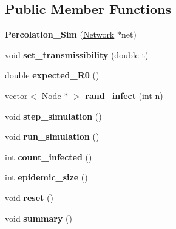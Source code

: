\subsection*{Public Member Functions}
\begin{DoxyCompactItemize}
\item 
\hypertarget{classPercolation__Sim_a68dc8b2121f6f555fd99711867634618}{}{\bfseries Percolation\+\_\+\+Sim} (\hyperlink{classNetwork}{Network} $\ast$net)\label{classPercolation__Sim_a68dc8b2121f6f555fd99711867634618}

\item 
\hypertarget{classPercolation__Sim_a331fbf29f66960463f2c6f2caab3bdf3}{}void {\bfseries set\+\_\+transmissibility} (double t)\label{classPercolation__Sim_a331fbf29f66960463f2c6f2caab3bdf3}

\item 
\hypertarget{classPercolation__Sim_ab0334facd8aebdb7df20e778a9577d09}{}double {\bfseries expected\+\_\+\+R0} ()\label{classPercolation__Sim_ab0334facd8aebdb7df20e778a9577d09}

\item 
\hypertarget{classPercolation__Sim_a71a7cd862e374aa87e7ff11f872aab0b}{}vector$<$ \hyperlink{classNode}{Node} $\ast$ $>$ {\bfseries rand\+\_\+infect} (int n)\label{classPercolation__Sim_a71a7cd862e374aa87e7ff11f872aab0b}

\item 
\hypertarget{classPercolation__Sim_abab9361ad723b13011469509dbcdddf4}{}void {\bfseries step\+\_\+simulation} ()\label{classPercolation__Sim_abab9361ad723b13011469509dbcdddf4}

\item 
\hypertarget{classPercolation__Sim_ac4deb883b042d030130f2619c62a25e3}{}void {\bfseries run\+\_\+simulation} ()\label{classPercolation__Sim_ac4deb883b042d030130f2619c62a25e3}

\item 
\hypertarget{classPercolation__Sim_a0ee2603b7f5aca0a2f0af5a8650d1872}{}int {\bfseries count\+\_\+infected} ()\label{classPercolation__Sim_a0ee2603b7f5aca0a2f0af5a8650d1872}

\item 
\hypertarget{classPercolation__Sim_a925aba2a0dcdbf8406e76acc15b1fbf8}{}int {\bfseries epidemic\+\_\+size} ()\label{classPercolation__Sim_a925aba2a0dcdbf8406e76acc15b1fbf8}

\item 
\hypertarget{classPercolation__Sim_a966c4deb4da447e6ca946361a01b4f7b}{}void {\bfseries reset} ()\label{classPercolation__Sim_a966c4deb4da447e6ca946361a01b4f7b}

\item 
\hypertarget{classPercolation__Sim_aaad5cfb0f15994f76f68e050290680e1}{}void {\bfseries summary} ()\label{classPercolation__Sim_aaad5cfb0f15994f76f68e050290680e1}

\end{DoxyCompactItemize}
